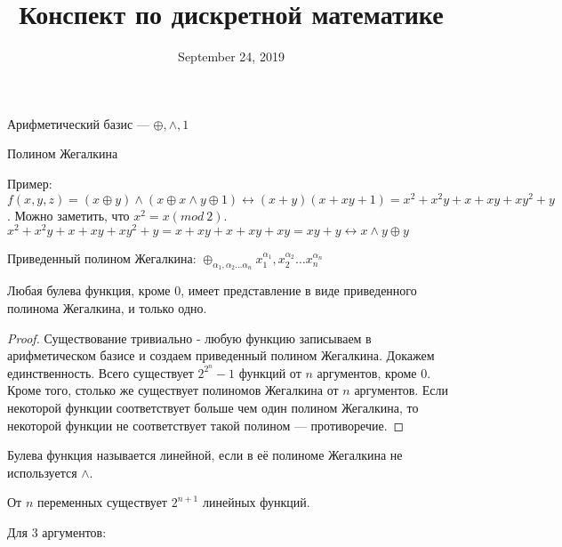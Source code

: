 

\title{Конспект по дискретной математике}
\date{September 24, 2019}


\maketitle

\begin{definition}
Арифметический базис --- $\oplus, \wedge, 1$
\end{definition}

Полином Жегалкина

Пример: $f(x,y,z)=(x\oplus y)\wedge(x\oplus x\wedge y\oplus 1)\leftrightarrow (x+y)(x+xy+1)
= x^2+x^2y+x+xy+xy^2+y$. Можно заметить, что $x^2=x (mod\ 2)$.
$x^2+x^2y+x+xy+xy^2+y=x+xy+x+xy+xy=xy+y\leftrightarrow x\wedge y\oplus y$

\begin{definition}
Приведенный полином Жегалкина: $\oplus_{\alpha_1,\alpha_2\ldots\alpha_n} x_1^{\alpha_1},
x_2^{\alpha_2}\ldots x_n^{\alpha_n}$
\end{definition}

\begin{theorem}
Любая булева функция, кроме $0$, имеет представление в виде приведенного полинома Жегалкина,
и только одно.
\end{theorem}

\begin{proof}
Существование тривиально - любую функцию записываем в арифметическом базисе и создаем
приведенный полином Жегалкина. Докажем единственность. Всего существует $2^{2^n}-1$ функций
от $n$ аргументов, кроме $0$. Кроме того, столько же существует полиномов Жегалкина от
$n$ аргументов. Если некоторой функции соответствует больше чем один полином Жегалкина, то
некоторой функции не соответствует такой полином --- противоречие.
\end{proof}

\begin{definition}
Булева функция называется линейной, если в её полиноме Жегалкина не используется $\wedge$.
\end{definition}

\begin{remark}
От $n$ переменных существует $2^{n+1}$ линейных функций.
\end{remark}

Для $3$ аргументов:


